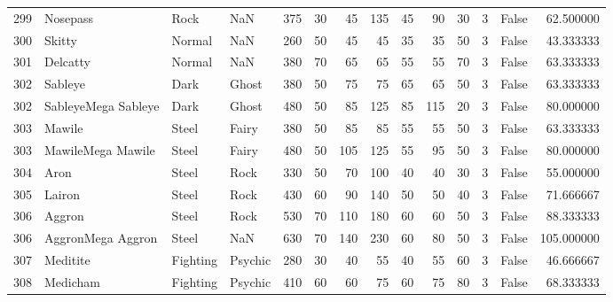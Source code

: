\begin{tabular}{rlllrrrrrrrrlr}
 299 &                   Nosepass &      Rock &       NaN &    375 &   30 &      45 &      135 &       45 &       90 &     30 &           3 &      False &   62.500000 \\
 300 &                     Skitty &    Normal &       NaN &    260 &   50 &      45 &       45 &       35 &       35 &     50 &           3 &      False &   43.333333 \\
 301 &                   Delcatty &    Normal &       NaN &    380 &   70 &      65 &       65 &       55 &       55 &     70 &           3 &      False &   63.333333 \\
 302 &                    Sableye &      Dark &     Ghost &    380 &   50 &      75 &       75 &       65 &       65 &     50 &           3 &      False &   63.333333 \\
 302 &        SableyeMega Sableye &      Dark &     Ghost &    480 &   50 &      85 &      125 &       85 &      115 &     20 &           3 &      False &   80.000000 \\
 303 &                     Mawile &     Steel &     Fairy &    380 &   50 &      85 &       85 &       55 &       55 &     50 &           3 &      False &   63.333333 \\
 303 &          MawileMega Mawile &     Steel &     Fairy &    480 &   50 &     105 &      125 &       55 &       95 &     50 &           3 &      False &   80.000000 \\
 304 &                       Aron &     Steel &      Rock &    330 &   50 &      70 &      100 &       40 &       40 &     30 &           3 &      False &   55.000000 \\
 305 &                     Lairon &     Steel &      Rock &    430 &   60 &      90 &      140 &       50 &       50 &     40 &           3 &      False &   71.666667 \\
 306 &                     Aggron &     Steel &      Rock &    530 &   70 &     110 &      180 &       60 &       60 &     50 &           3 &      False &   88.333333 \\
 306 &          AggronMega Aggron &     Steel &       NaN &    630 &   70 &     140 &      230 &       60 &       80 &     50 &           3 &      False &  105.000000 \\
 307 &                   Meditite &  Fighting &   Psychic &    280 &   30 &      40 &       55 &       40 &       55 &     60 &           3 &      False &   46.666667 \\
 308 &                   Medicham &  Fighting &   Psychic &    410 &   60 &      60 &       75 &       60 &       75 &     80 &           3 &      False &   68.333333 \\

\end{tabular}
